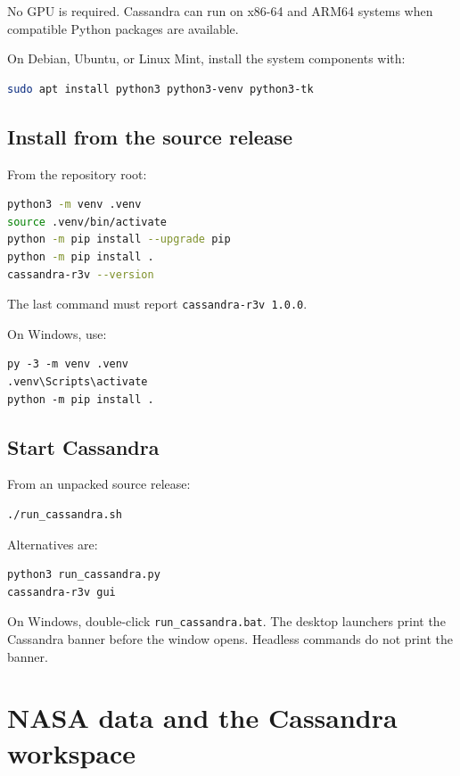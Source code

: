 \documentclass[11pt,a4paper]{article}
\begin{document}
No GPU is required. Cassandra can run on x86-64 and ARM64 systems when compatible
Python packages are available.

On Debian, Ubuntu, or Linux Mint, install the system components with:

\begin{lstlisting}[language=bash]
sudo apt install python3 python3-venv python3-tk
\end{lstlisting}

\subsection{Install from the source release}

From the repository root:

\begin{lstlisting}[language=bash]
python3 -m venv .venv
source .venv/bin/activate
python -m pip install --upgrade pip
python -m pip install .
cassandra-r3v --version
\end{lstlisting}

The last command must report \texttt{cassandra-r3v 1.0.0}.

On Windows, use:

\begin{lstlisting}
py -3 -m venv .venv
.venv\Scripts\activate
python -m pip install .
\end{lstlisting}

\subsection{Start Cassandra}

From an unpacked source release:

\begin{lstlisting}[language=bash]
./run_cassandra.sh
\end{lstlisting}

Alternatives are:

\begin{lstlisting}[language=bash]
python3 run_cassandra.py
cassandra-r3v gui
\end{lstlisting}

On Windows, double-click \texttt{run\_cassandra.bat}. The desktop launchers print
the Cassandra banner before the window opens. Headless commands do not print the
banner.

\section{NASA data and the Cassandra workspace}
\end{document}
